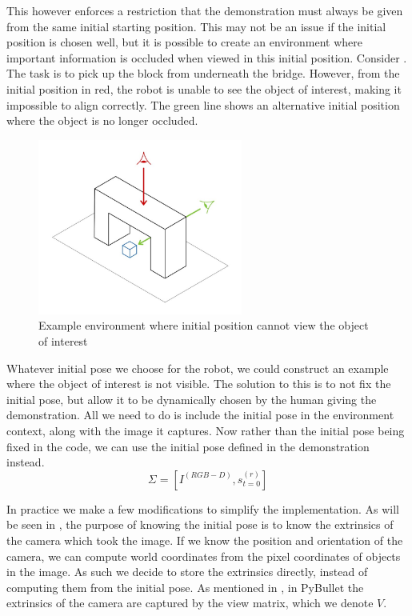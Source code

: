 This however enforces a restriction that the demonstration must always be given from the same initial starting position. This may not be an issue if the initial position is chosen well, but it is possible to create an environment where important information is occluded when viewed in this initial position. Consider . The task is to pick up the block from underneath the bridge. However, from the initial position in red, the robot is unable to see the object of interest, making it impossible to align correctly. The green line shows an alternative initial position where the object is no longer occluded.\\

\begin{figure}[h]
    \centering
    \includegraphics[width=0.6\textwidth]{figures/occluded-no-bg.jpg}
    \caption{Example environment where initial position cannot view the object of interest}
    \label{fig:occluded}
\end{figure}

Whatever initial pose we choose for the robot, we could construct an example where the object of interest is not visible. The solution to this is to not fix the initial pose, but allow it to be dynamically chosen by the human giving the demonstration. All we need to do is include the initial pose in the environment context, along with the image it captures. Now rather than the initial pose being fixed in the code, we can use the initial pose defined in the demonstration instead.
$$\Sigma = [I^{(RGB-D)}, s^{(r)}_{t=0}]$$

In practice we make a few modifications to simplify the implementation. As will be seen in , the purpose of knowing the initial pose is to know the extrinsics of the camera which took the image. If we know the position and orientation of the camera, we can compute world coordinates from the pixel coordinates of objects in the image. As such we decide to store the extrinsics directly, instead of computing them from the initial pose. As mentioned in , in PyBullet the extrinsics of the camera are captured by the view matrix, which we denote $V$.\\

